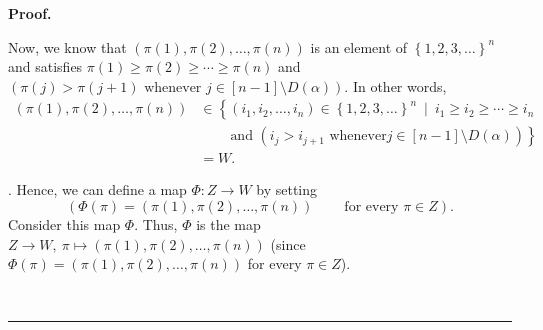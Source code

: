 \documentclass[numbers=enddot,12pt,final,onecolumn,notitlepage,abstracton]{scrartcl}
\theoremstyle{definition}
\newenvironment{proof}[1][Proof]{\noindent\textbf{#1.} }{\ \rule{0.5em}{0.5em}}
\newenvironment{verlong}{}{}
\begin{document}
\begin{verlong}
\begin{footnotesize}
\begin{proof}
{\par
Now, we know that $\left(  \pi\left(  1\right)  ,\pi\left(  2\right)
,\ldots,\pi\left(  n\right)  \right)  $ is an element of $\left\{
1,2,3,\ldots\right\}  ^{n}$ and satisfies $\pi\left(  1\right)  \geq\pi\left(
2\right)  \geq\cdots\geq\pi\left(  n\right)  $ and $\left(  \pi\left(
j\right)  >\pi\left(  j+1\right)  \text{ whenever }j\in\left[  n-1\right]
\setminus D\left(  \alpha\right)  \right)  $. In other words,%
\begin{align*}
\left(  \pi\left(  1\right)  ,\pi\left(  2\right)  ,\ldots,\pi\left(
n\right)  \right)   &  \in\left\{  \left(  i_{1},i_{2},\ldots,i_{n}\right)
\in\left\{  1,2,3,\ldots\right\}  ^{n}\ \mid\ i_{1}\geq i_{2}\geq\cdots\geq
i_{n}\right.  \\
&  \ \ \ \ \ \ \ \ \ \ \left.  \text{and }\left(  i_{j}>i_{j+1}\text{ whenever
}j\in\left[  n-1\right]  \setminus D\left(  \alpha\right)  \right)  \right\}
\\
&  =W.
\end{align*}
}. Hence, we can define a map $\Phi:Z\rightarrow W$ by setting%
\[
\left(  \Phi\left(  \pi\right)  =\left(  \pi\left(  1\right)  ,\pi\left(
2\right)  ,\ldots,\pi\left(  n\right)  \right)  \ \ \ \ \ \ \ \ \ \ \text{for
every }\pi\in Z\right)  .
\]
Consider this map $\Phi$. Thus, $\Phi$ is the map $Z\rightarrow W,\ \pi
\mapsto\left(  \pi\left(  1\right)  ,\pi\left(  2\right)  ,\ldots,\pi\left(
n\right)  \right)  $ (since $\Phi\left(  \pi\right)  =\left(  \pi\left(
1\right)  ,\pi\left(  2\right)  ,\ldots,\pi\left(  n\right)  \right)  $ for
every $\pi\in Z$).


\end{proof}
\end{footnotesize}
\end{verlong}
\end{document}
